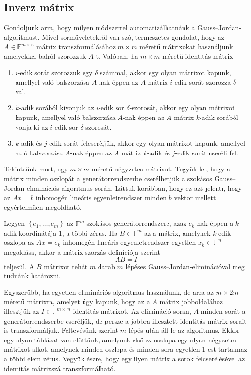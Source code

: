 \documentclass[9pt, a4paper, showtrims]{memoir}
\theoremstyle{plain}
\theoremstyle{remark}
\theoremstyle{definition}
\begin{document}
\subsection{Inverz mátrix}
Gondoljunk arra, hogy milyen módszerrel automatizálhatnánk a Gauss--Jordan-algoritmust. 
Mivel sorműveletekről van szó, természetes gondolat, hogy az $A\in\mathbb{F}^{m\times n}$
mátrix transzformálásához $m\times m$ méretű mátrixokat használjunk,
amelyekkel balról szorozzuk $A$-t.
Valóban, ha $m\times m$ méretű identitás mátrix 
\begin{enumerate}
    \item 
        $i$-edik sorát szorozzuk egy $\delta$ számmal,
        akkor egy olyan mátrixot kapunk, 
        amellyel való balszorzása $A$-nak éppen az $A$ mátrix 
        $i$-edik sorát szorozza $\delta$-val.
    \item
        $k$-adik sorából kivonjuk az $i$-edik sor $\delta$-szorosát,
        akkor egy olyan mátrixot kapunk, 
        amellyel való balszorzása $A$-nak éppen az $A$ mátrix 
        $k$-adik sorából vonja ki az $i$-edik sor $\delta$-szorosát.
    \item
        $k$-adik és $j$-edik sorát felcseréljük,
        akkor egy olyan mátrixot kapunk, 
        amellyel való balszorzása $A$-nak éppen az $A$ mátrix 
        $k$-adik és $j$-edik sorát cseréli fel.
\end{enumerate}

Tekintsünk most, egy $m\times m$ méretű négyzetes mátrixot.
Tegyük fel, hogy a mátrix minden oszlopát a generátorrendszerbe cserélhetjük
a szokásos Gauss--Jordan-eliminációs algoritmus  során.
Láttuk korábban, hogy ez azt jelenti, hogy az $Ax=b$ inhomogén lineáris egyenletrendszer
minden $b$ vektor mellett egyértelműen megoldható.

Legyen $\left\{ e_1,\dots,e_m \right\}$ az $\mathbb{F}^m$ szokásos generátorrendszere,
azaz $e_k$-nak éppen a $k$-adik koordinátája 1, a többi zérus.
Ha $B\in\mathbb{F}^m$ az a mátrix, 
amelynek $k$-edik oszlopa az $Ax=e_k$ inhomogén lineáris egyenletrendszer egyetlen $x_k\in\mathbb{F}^m$ megoldása,
akkor a mátrix szorzás definíciója szerint 
\[
    AB=I
\]
teljesül.
A $B$ mátrixot tehát $m$ darab $m$ lépéses Gauss--Jordan-eliminációval  meg tudnánk határozni.

Egyszerűbb, 
ha egyetlen eliminációs algoritmus használunk, de arra az $m\times 2m$ méretű mátrixra,
amelyet úgy kapunk, hogy az a $A$ mátrix jobboldalához illesztjük az $I\in\mathbb{F}^{m\times m}$ identitás mátrixot.
Az elimináció során, 
$A$ minden sorát a generátorrendszerbe cseréljük, de persze a jobbra illesztett identitás
mátrix sorait is transzformáljuk.
Feltevésünk szerint $m$ lépés után áll le az algoritmus.
Ekkor egy  olyan táblázat van előttünk, amelynek első $m$ oszlopa egy olyan négyzetes
mátrixot alkot, amelynek minden oszlopa és minden sora egyetlen 1-est tartalmaz a többi elem zérus. 
Vegyük észre, 
hogy egy ilyen mátrix a sorok felcserélésével az identitás mátrixszá transzformálható.
\end{document}
